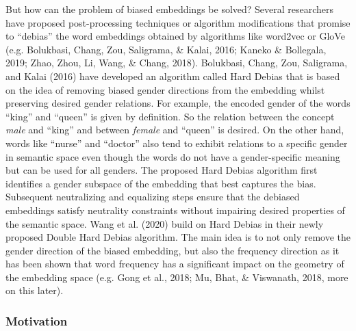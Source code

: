\documentclass[
  english,
  man,floatsintext]{apa6}
\begin{document}
But how can the problem of biased embeddings be solved? Several researchers have proposed post-processing techniques or algorithm modifications that promise to ``debias'' the word embeddings obtained by algorithms like word2vec or GloVe (e.g. Bolukbasi, Chang, Zou, Saligrama, \& Kalai, 2016; Kaneko \& Bollegala, 2019; Zhao, Zhou, Li, Wang, \& Chang, 2018).
Bolukbasi, Chang, Zou, Saligrama, and Kalai (2016) have developed an algorithm called Hard Debias that is based on the idea of removing biased gender directions from the embedding whilst preserving desired gender relations. For example, the encoded gender of the words ``king'' and ``queen'' is given by definition. So the relation between the concept \emph{male} and ``king'' and between \emph{female} and ``queen'' is desired. On the other hand, words like ``nurse'' and ``doctor'' also tend to exhibit relations to a specific gender in semantic space even though the words do not have a gender-specific meaning but can be used for all genders. The proposed Hard Debias algorithm first identifies a gender subspace of the embedding that best captures the bias. Subsequent neutralizing and equalizing steps ensure that the debiased embeddings satisfy neutrality constraints without impairing desired properties of the semantic space.
Wang et al. (2020) build on Hard Debias in their newly proposed Double Hard Debias algorithm. The main idea is to not only remove the gender direction of the biased embedding, but also the frequency direction as it has been shown that word frequency has a significant impact on the geometry of the embedding space (e.g. Gong et al., 2018; Mu, Bhat, \& Viswanath, 2018, more on this later).

\hypertarget{motivation}{%
\subsubsection{Motivation}\label{motivation}}
\end{document}
